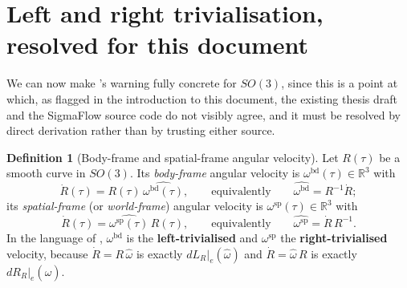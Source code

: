 \documentclass[11pt,a4paper]{report}
\theoremstyle{definition}
\newtheorem{definition}[definition]{Definition}
\theoremstyle{remark}
\newcommand{\RR}{\mathbb R}
\begin{document}
\section{Left and right trivialisation, resolved for this document}
\label{sec:so3-trivialisation}

We can now make 's warning fully concrete for
$SO(3)$, since this is a point at which, as flagged in the introduction to
this document, the existing thesis draft and the SigmaFlow source code do
not visibly agree, and it must be resolved by direct derivation rather than
by trusting either source.

\begin{definition}[Body-frame and spatial-frame angular velocity]
\label{def:trivialisation-scratch}
Let $R(\tau)$ be a smooth curve in $SO(3)$. Its \emph{body-frame} angular
velocity is $\omega^{\mathrm{bd}}(\tau)\in\RR^3$ with
\[
\dot R(\tau) = R(\tau)\,\widehat{\omega^{\mathrm{bd}}(\tau)} ,
\qquad\text{equivalently}\qquad
\widehat{\omega^{\mathrm{bd}}} = R^{-1}\dot R ;
\]
its \emph{spatial-frame} (or \emph{world-frame}) angular velocity is
$\omega^{\mathrm{sp}}(\tau)\in\RR^3$ with
\[
\dot R(\tau) = \widehat{\omega^{\mathrm{sp}}(\tau)}\,R(\tau) ,
\qquad\text{equivalently}\qquad
\widehat{\omega^{\mathrm{sp}}} = \dot R\,R^{-1} .
\]
In the language of , $\omega^{\mathrm{bd}}$ is the
\textbf{left-trivialised} and $\omega^{\mathrm{sp}}$ the
\textbf{right-trivialised} velocity, because $\dot R = R\,\widehat\omega$ is
exactly $dL_R|_e(\widehat\omega)$ and $\dot R = \widehat\omega\,R$ is exactly
$dR_R|_e(\widehat\omega)$.
\end{definition}
\end{document}
